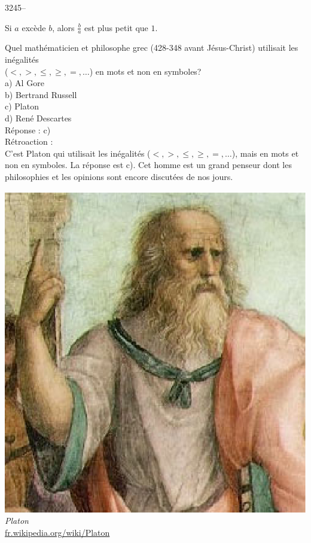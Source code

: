 \documentclass[letterpaper, 12pt]{article}
\begin{document}
3245--
\begin{center}
\og Si $a$ exc\`ede $b$, alors $\frac{b}{a}$ est plus petit que $1$. \fg
\end{center}
Quel math\'ematicien et philosophe grec (428-348 avant J\'esus-Christ) utilisait les in\'egalit\'es\\ ($<, >, \leqslant, \geqslant, =, \dots$) en mots et non en symboles?\\

a) Al Gore\\
b) Bertrand Russell\\
c) Platon\\
d) Ren\'e Descartes\\

R\'eponse : c)\\

R\'etroaction :\\
C'est Platon qui utilisait les in\'egalit\'es ($<, >, \leqslant, \geqslant, =, \dots$), mais en mots et non en symboles. La r\'eponse est c). Cet homme est un grand penseur dont les philosophies et les opinions sont encore discut\'ees de nos jours.
\begin{center}
\includegraphics[scale=0.4]{Platon.eps}\\
\emph{{\small Platon}}\\
\href{http://fr.wikipedia.org/wiki/Platon}{fr.wikipedia.org/wiki/Platon}\\[5mm]
\end{center}
\end{document}
